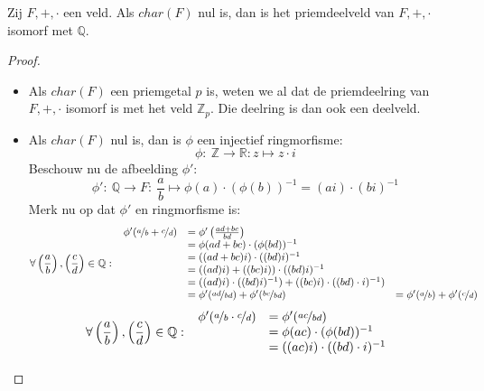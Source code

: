 \documentclass[main.tex]{subfiles}
\begin{document}
\begin{st}
  Zij $F,+,\cdot$ een veld.
  Als $char(F)$ nul is, dan is het priemdeelveld van $F,+,\cdot$ isomorf met $\mathbb{Q}$.

  \begin{proof}
    \begin{itemize}
    \item Als $char(F)$ een priemgetal $p$ is, weten we al dat de priemdeelring van $F,+,\cdot$ isomorf is met het veld $\mathbb{Z}_{p}$.
      Die deelring is dan ook een deelveld.
    \item Als $char(F)$ nul is, dan is $\phi$ een injectief ringmorfisme:
      \[ \phi:\ \mathbb{Z} \rightarrow \mathbb{R}: z \mapsto z\cdot i \]
      Beschouw nu de afbeelding $\phi'$:
      \[ \phi':\ \mathbb{Q} \rightarrow F:\ \frac{a}{b} \mapsto \phi(a) \cdot (\phi(b))^{-1} = (ai) \cdot (bi)^{-1} \]
      Merk nu op dat $\phi'$ en ringmorfisme is:
      \[
      \forall \left(\frac{a}{b}\right),\left(\frac{c}{d}\right) \in
      \mathbb{Q}:\
      \begin{array}{rll}
        \phi'(\nicefrac{a}{b} + \nicefrac{c}{d}) &=  \phi'\left(\frac{ad+bc}{bd}\right) &\\
                                                 &= \phi(ad+bc) \cdot (\phi(bd))^{-1} &\\
                                                 &= ((ad+bc)i) \cdot ((bd)i)^{-1} &\\
                                                 &= ((ad)i) + ((bc)i)) \cdot ((bd)i)^{-1} &\\
                                                 &= ((ad)i)\cdot ((bd)i)^{-1}) +  ((bc)i) \cdot ((bd)\cdot i)^{-1}) &\\
                                                 &= \phi'(\nicefrac{ad}{bd}) + \phi'(\nicefrac{bc}{bd}) &= \phi'(\nicefrac{a}{b}) + \phi'(\nicefrac{c}{d}) \\
      \end{array}
      \]
      \[
      \forall \left(\frac{a}{b}\right),\left(\frac{c}{d}\right) \in
      \mathbb{Q}:\
      \begin{array}{rll}
        \phi'(\nicefrac{a}{b} \cdot \nicefrac{c}{d}) &= \phi'(\nicefrac{ac}{bd}) &\\
                                                     &= \phi(ac) \cdot (\phi(bd))^{-1} &\\
                                                     &= ((ac)i) \cdot ((bd) \cdot i)^{-1} &\\

\end{array}\]
\end{itemize}
\end{proof}
\end{st}
\end{document}
